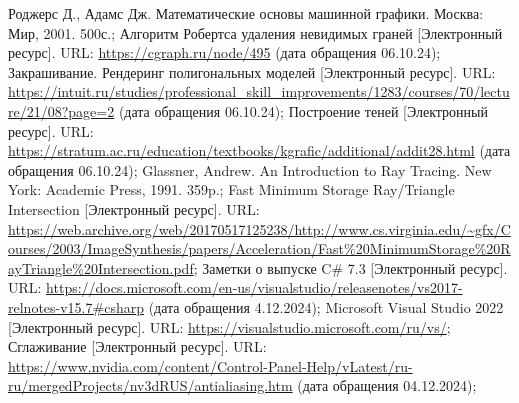 \begin{thebibliography}{}
	 Роджерс Д., Адамс Дж. Математические основы машинной графики. Москва: Мир, 2001. 500с.;
	 Алгоритм Робертса удаления невидимых граней [Электронный ресурс]. URL: \url{https://cgraph.ru/node/495} (дата обращения 06.10.24);
	 Закрашивание. Рендеринг полигональных моделей [Электронный ресурс]. URL: \url{https://intuit.ru/studies/professional\_skill\_improvements/1283/courses/70/lecture/21/08?page=2} (дата обращения 06.10.24);
	 Построение теней [Электронный ресурс]. URL: \url{https://stratum.ac.ru/education/textbooks/kgrafic/additional/addit28.html} (дата обращения 06.10.24);
	 Glassner, Andrew. An Introduction to Ray Tracing. New York: Academic Press, 1991. 359p.;
	 Fast Minimum Storage Ray/Triangle Intersection [Электронный ресурс]. URL: \url{https://web.archive.org/web/20170517125238/http://www.cs.virginia.edu/~gfx/Courses/2003/ImageSynthesis/papers/Acceleration/Fast\%20MinimumStorage\%20RayTriangle\%20Intersection.pdf};
	 Заметки о выпуске C\# 7.3 [Электронный ресурс]. URL: \url{https://docs.microsoft.com/en-us/visualstudio/releasenotes/vs2017-relnotes-v15.7#csharp} (дата обращения 4.12.2024);
	 Microsoft Visual Studio 2022 [Электронный ресурс]. URL: \url{https://visualstudio.microsoft.com/ru/vs/};
	 Сглаживание [Электронный ресурс]. URL: \url{https://www.nvidia.com/content/Control-Panel-Help/vLatest/ru-ru/mergedProjects/nv3dRUS/antialiasing.htm} (дата обращения 04.12.2024);
	
\end{thebibliography}
